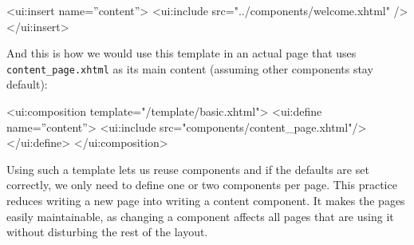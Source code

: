 \begtt

<ui:insert name=”content”>
        <ui:include src="../components/welcome.xhtml" />
</ui:insert>

\endtt

And this is how we would use this template in an actual page that uses {\tt content\_page.xhtml} as its main content (assuming other components stay default):

\begtt

<ui:composition template="/template/basic.xhtml">
        <ui:define name=”content”>
                <ui:include src="components/content_page.xhtml"/>
        </ui:define>
</ui:composition>

\endtt

Using such a template lets us reuse components and if the defaults are set correctly, we only need to define one or two components per page. This practice reduces writing a new page into writing a content component. It makes the pages easily maintainable, as changing a component affects all pages that are using it without disturbing the rest of the layout.




